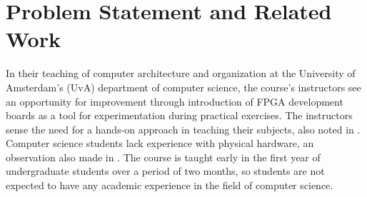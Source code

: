 \documentclass[openright]{template/uva-bachelor-thesis}
\begin{document}





\newpage
\section{Problem Statement and Related Work}
In their teaching of computer architecture and organization at the University of Amsterdam's (UvA) department of computer science, the course's instructors see an opportunity for improvement through introduction of FPGA development boards as a tool for experimentation during practical exercises. The instructors sense the need for a hands-on approach in teaching their subjects, also noted in \cite{cifredo2015computer, oztekin2011bzk}. Computer science students lack experience with physical hardware, an observation also made in \cite{el2011teaching}. The course is taught early in the first year of undergraduate students over a period of two months, so students are not expected to have any academic experience in the field of computer science. 
\end{document}
